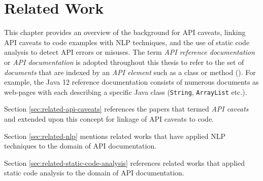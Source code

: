 \chapter{Related Work}
\label{cha:background}
This chapter provides an overview of the background for API caveats, linking API caveats to code examples with NLP techniques, and the use of static code analysis to detect API errors or misuses. The term \textit{API reference documentation} or \textit{API documentation} is adopted throughout this thesis to refer to the set of \textit{documents} that are indexed by an \textit{API element} such as a class or method (\cite{maalej2013patterns}). For example, the Java 12 reference documentation consists of numerous documents as web-pages with each describing a specific Java class (\lstinline{String}, \lstinline{ArrayList} etc.). \bigbreak

Section \ref{sec:related-api-caveats} references the papers that termed \textit{API caveats} and extended upon this concept for linkage of API caveats to code.\bigbreak

Section \ref{sec:related-nlp} mentions related works that have applied NLP techniques to the domain of API documentation.\bigbreak

Section \ref{sec:related-static-code-analysis} references related works that applied static code analysis to the domain of API documentation.\bigbreak

